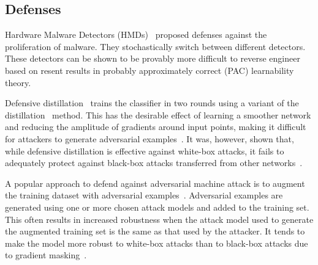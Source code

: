 
\subsection{Defenses}

 Hardware Malware Detectors (HMDs)~\cite{RHMD2017} proposed defenses against the proliferation of malware. They stochastically switch between different detectors. These detectors can be shown to be provably more difficult to
reverse engineer based on resent results in probably approximately
correct (PAC) learnability theory. 

Defensive distillation~\cite{papernot2016distillation} trains the classifier in two rounds using a variant of the
distillation~\cite{hinton2015distilling} method. This has the desirable effect of learning a smoother network
and reducing the amplitude of gradients around input points, making it difficult for attackers to
generate adversarial examples~\cite{papernot2016distillation}. It was, however, shown that, while defensive
distillation is effective against white-box attacks, it fails to adequately protect against black-box
attacks transferred from other networks~\cite{Carlini2017}.

A popular approach to defend against adversarial machine attack is to augment the training dataset with adversarial examples~\cite{szegedy2014going, Goodfellow2015ADVexample, moosavidezfooli2016deepfool}. Adversarial examples are generated using one or more chosen attack models and added to the training
set. This often results in increased robustness when the attack model used to generate the augmented
training set is the same as that used by the attacker. It tends to make the model more robust to white-box attacks than to black-box attacks due to gradient masking~\cite{Papernot2016TowardsTS, tramer2020ensemble}.



